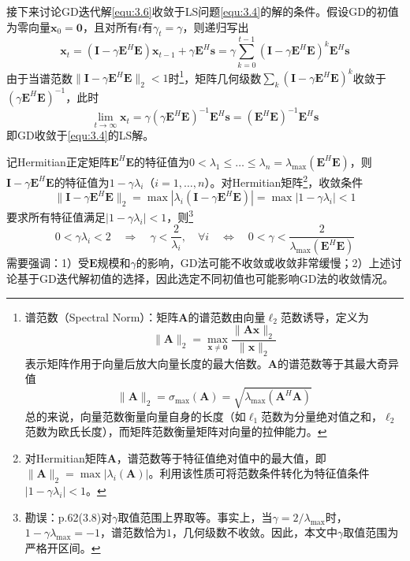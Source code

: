 \documentclass[12pt]{article}
\begin{document}
接下来讨论GD迭代解\autoref{equ:3.6}收敛于LS问题\autoref{equ:3.4}的解的条件。假设GD的初值为零向量$\bm{x}_0=\bm{0}$，且对所有$t$有$\gamma_t=\gamma$，则递归写出
\begin{equation}
    \bm{x}_t=(\mathbf{I}-\gamma\mathbf{E}^H\mathbf{E})\bm{x}_{t-1}+\gamma\mathbf{E}^H\bm{s}=\gamma\sum_{k=0}^{t-1}(\mathbf{I}-\gamma\mathbf{E}^H\mathbf{E})^k\mathbf{E}^H\bm{s}
    \label{equ:3.7}
\end{equation}
由于当谱范数$\|\mathbf{I}-\gamma\mathbf{E}^H\mathbf{E}\|_2<1$时\footnote{谱范数（Spectral Norm）：矩阵$\mathbf{A}$的谱范数由向量$\ell_2$范数诱导，定义为
\begin{equation}
    \|\mathbf{A}\|_2=\max_{\bm{x}\neq\bm{0}}\frac{\|\mathbf{A}\bm{x}\|_2}{\|\bm{x}\|_2}
\end{equation}
表示矩阵作用于向量后放大向量长度的最大倍数。$\mathbf{A}$的谱范数等于其最大奇异值
\begin{equation}
    \|\mathbf{A}\|_2=\sigma_{\max}(\mathbf{A})=\sqrt{\lambda_{\max}(\mathbf{A}^H\mathbf{A})}
\end{equation}
总的来说，向量范数衡量向量自身的长度（如$\ell_1$范数为分量绝对值之和，$\ell_2$范数为欧氏长度），而矩阵范数衡量矩阵对向量的拉伸能力。}，矩阵几何级数$\sum_k (\mathbf{I}-\gamma\mathbf{E}^H\mathbf{E})^k$收敛于$(\gamma\mathbf{E}^H\mathbf{E})^{-1}$，此时
\begin{equation}
    \lim_{t\to\infty}\bm{x}_t=\gamma(\gamma\mathbf{E}^H\mathbf{E})^{-1}\mathbf{E}^H\bm{s}=(\mathbf{E}^H\mathbf{E})^{-1}\mathbf{E}^H\bm{s}
\end{equation}
即GD收敛于\autoref{equ:3.4}的LS解。

记Hermitian正定矩阵$\mathbf{E}^H\mathbf{E}$的特征值为$0<\lambda_1\le\ldots\le\lambda_n=\lambda_{\max}(\mathbf{E}^H\mathbf{E})$，则$\mathbf{I}-\gamma\mathbf{E}^H\mathbf{E}$的特征值为$1-\gamma\lambda_i$（$i=1,\ldots,n$）。对Hermitian矩阵\footnote{对Hermitian矩阵$\mathbf{A}$，谱范数等于特征值绝对值中的最大值，即$\|\mathbf{A}\|_2=\max|\lambda_i(\mathbf{A})|$。利用该性质可将范数条件转化为特征值条件$|1-\gamma\lambda_i|<1$。}，收敛条件
\begin{equation}
    \|\mathbf{I}-\gamma\mathbf{E}^H\mathbf{E}\|_2=\max\left|\lambda_i\left(\mathbf{I}-\gamma\mathbf{E}^H\mathbf{E}\right)\right|=\max\left|1-\gamma\lambda_i\right|<1
\end{equation}
要求所有特征值满足$|1-\gamma\lambda_i|<1$，则\footnote{勘误：p.62(3.8)对$\gamma$取值范围上界取等。事实上，当$\gamma=2/\lambda_{\max}$时，$1-\gamma\lambda_{\max}=-1$，谱范数恰为$1$，几何级数不收敛。因此，本文中$\gamma$取值范围为严格开区间。}
\begin{equation}
    0<\gamma\lambda_i<2
    \quad\Rightarrow\quad
    \gamma<\frac{2}{\lambda_i},\quad\forall i
    \quad\Leftrightarrow\quad
    \boxed{0<\gamma<\frac{2}{\lambda_{\max}(\mathbf{E}^H\mathbf{E})}}
    \label{equ:3.8}
\end{equation}
需要强调：1）受$\mathbf{E}$规模和$\gamma$的影响，GD法可能不收敛或收敛非常缓慢；2）上述讨论基于GD迭代解初值的选择，因此选定不同初值也可能影响GD法的收敛情况。
\end{document}
